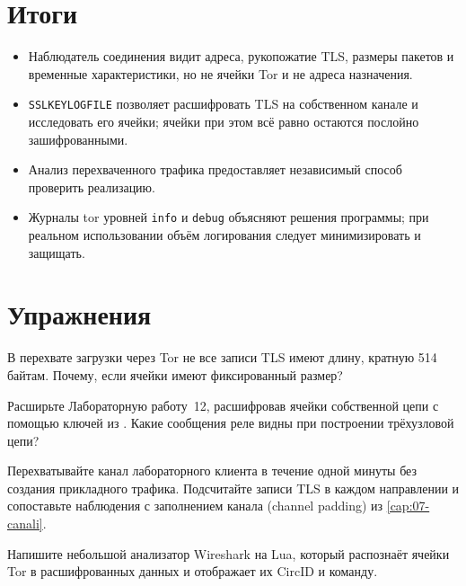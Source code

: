 \section*{Итоги}
\begin{itemize}
  \item Наблюдатель соединения видит адреса, рукопожатие TLS, размеры пакетов и временные характеристики, но не ячейки Tor и не адреса назначения.
  \item \texttt{SSLKEYLOGFILE} позволяет расшифровать TLS на собственном канале и исследовать его ячейки; ячейки  при этом всё равно остаются послойно зашифрованными.
  \item Анализ перехваченного трафика предоставляет независимый способ проверить реализацию.
  \item Журналы tor уровней \texttt{info} и \texttt{debug} объясняют решения программы; при реальном использовании объём логирования следует минимизировать и защищать.
\end{itemize}

\section*{Упражнения}

\begin{esercizio}[1]\label{es:20-dimensioni}
В перехвате загрузки через Tor не все записи TLS имеют длину, кратную 514 байтам. Почему, если ячейки имеют фиксированный размер?
\end{esercizio}

\begin{esercizio}[2]\label{es:20-relay}
Расширьте Лабораторную работу~12, расшифровав ячейки  собственной цепи с помощью ключей из . Какие сообщения реле видны при построении трёхузловой цепи?
\end{esercizio}

\begin{esercizio}[2]\label{es:20-padding}
Перехватывайте канал лабораторного клиента в течение одной минуты без создания прикладного трафика. Подсчитайте записи TLS в каждом направлении и сопоставьте наблюдения с заполнением канала (channel padding) из \cref{cap:07-canali}.
\end{esercizio}

\begin{esercizio}[3]\label{es:20-dissector}
Напишите небольшой анализатор Wireshark на Lua, который распознаёт ячейки Tor в расшифрованных данных и отображает их CircID и команду.
\end{esercizio}

